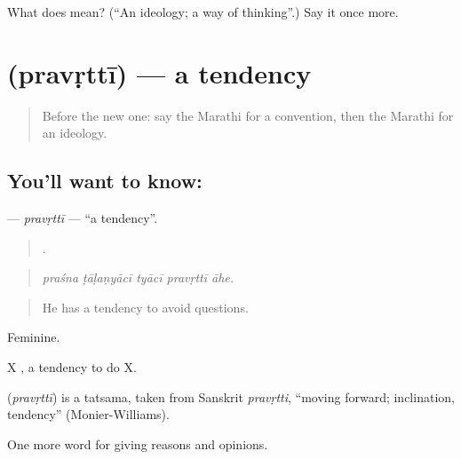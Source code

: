\begin{tcolorbox}[breakable,colback=teal!4,colframe=teal!35!black,title={Before you move on}]
What does  mean? (\textquotedblleft{}An ideology; a way of thinking\textquotedblright{}.) Say it once more.
\end{tcolorbox}
\section[\texorpdfstring{\mr{प्रवृत्ती} (pravṛttī)}{प्रवृत्ती (pravṛttī)}]{ (pravṛttī) — a tendency}

\label{lesson:MR-C367-pravrtti}



\begin{quote}
Before the new one: say the Marathi for a convention, then the Marathi for an ideology.
\end{quote}

\subsection*{You'll want to know: }
\textbf{} — \emph{pravṛttī} — \textquotedblleft{}a tendency\textquotedblright{}.

\begin{quote}
    .
\end{quote}

\begin{quote}
\emph{praśna ṭāḷaṇyācī tyācī pravṛttī āhe.}
\end{quote}

\begin{quote}
He has a tendency to avoid questions.
\end{quote}

Feminine.

X  , a tendency to do X.

\begin{cousinweb}
\textbf{} (\emph{pravṛttī}) is a tatsama, taken from Sanskrit \emph{pravṛtti}, \textquotedblleft{}moving forward; inclination, tendency\textquotedblright{} (Monier-Williams).
\end{cousinweb}

\begin{grammarlens}[title={What you've built}]
One more word for giving reasons and opinions.
\end{grammarlens}

